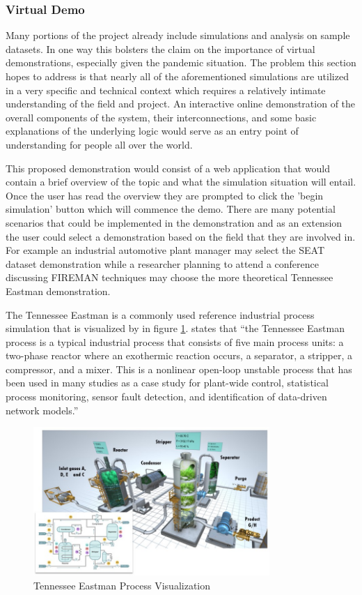 \subsubsection{Virtual Demo}
\label{ref_virtual_demo}

Many portions of the project already include simulations and analysis on sample datasets. In one way this bolsters the claim on the importance of virtual demonstrations, especially given the pandemic situation. The problem this section hopes to address is that nearly all of the aforementioned simulations are utilized in a very specific and technical context which requires a relatively intimate understanding of the field and project. An interactive online demonstration of the overall components of the system, their interconnections, and some basic explanations of the underlying logic would serve as an entry point of understanding for people all over the world. 

This proposed demonstration would consist of a web application that would contain a brief overview of the topic and what the simulation situation will entail. Once the user has read the overview they are prompted to click the 'begin simulation' button which will commence the demo. There are many potential scenarios that could be implemented in the demonstration and as an extension the user could select a demonstration based on the field that they are involved in. For example an industrial automotive plant manager may select the SEAT dataset demonstration while a researcher planning to attend a conference discussing FIREMAN techniques may choose the more theoretical Tennessee Eastman demonstration. 

The Tennessee Eastman is a commonly used reference industrial process simulation that is visualized by \cite{tennessee-eastman-medium} in figure \ref{fig:tennessee-eastman-medium}. \cite{tennessee-eastman-model} states that ``the Tennessee Eastman process is a typical industrial process that consists of five main process units: a two-phase reactor where an exothermic reaction occurs, a separator, a stripper, a compressor, and a mixer. This is a nonlinear open-loop unstable process that has been used in many studies as a case study for plant-wide control, statistical process monitoring, sensor fault detection, and identification of data-driven network models.''
\begin{figure}[H]
    \centering
    \includegraphics[width=0.8\textwidth]{Images/tennessee_eastman.jpg}
    \caption{Tennessee Eastman Process Visualization}
    \label{fig:tennessee-eastman-medium}
\end{figure}

